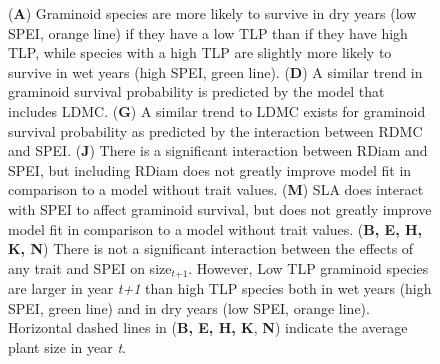 \documentclass[12pt, letterpaper]{article}
\begin{document}
\begin{figure}
   \ContinuedFloat
   \caption{
(\textbf{A}) Graminoid species are more likely to survive in dry years (low SPEI, orange line) if they have a low TLP than if they have high TLP, while species with a high TLP are slightly more likely to survive in wet years (high SPEI, green line). %
(\textbf{D}) A similar trend in graminoid survival probability is predicted by the model that includes LDMC. %
(\textbf{G}) A similar trend to LDMC exists for graminoid survival probability as predicted by the interaction between RDMC and SPEI. %
(\textbf{J}) There is a significant interaction between RDiam and SPEI, but including RDiam does not greatly improve model fit in comparison to a model without trait values. %
(\textbf{M}) SLA does interact with SPEI to affect graminoid survival, but does not greatly improve model fit in comparison to a model without trait values.  %
(\textbf{B, E, H, K, N}) There is not a significant interaction between the effects of any trait and SPEI on size$_\textit{t+1}$. However, Low TLP graminoid species are larger in year \textit{t+1} than high TLP species both in wet years (high SPEI, green line) and in dry years (low SPEI, orange line). %
Horizontal dashed lines in (\textbf{B, E, H, K}, \textbf{N}) indicate the average plant size in year \textit{t}. 
}
\end{figure}
\end{document}
